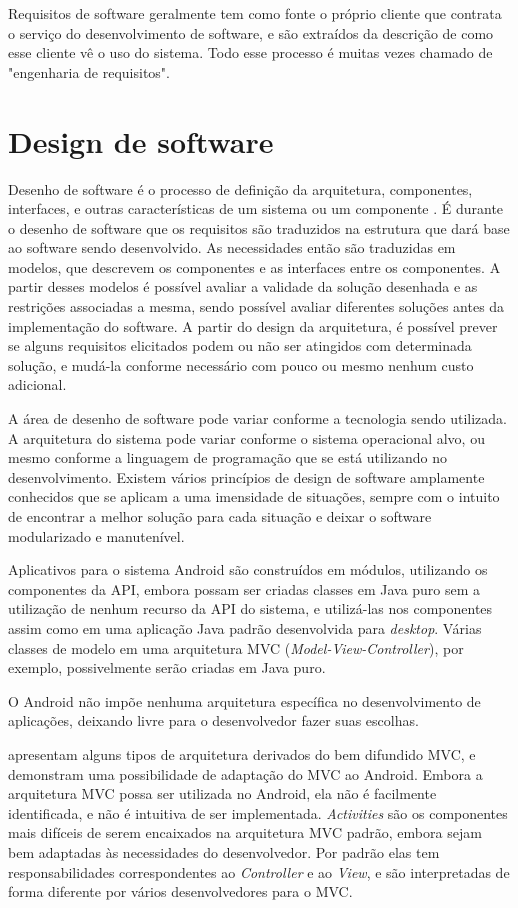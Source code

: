 Requisitos de software geralmente tem como fonte o próprio cliente que contrata o serviço do desenvolvimento de software, e são extraídos da descrição de como esse cliente vê o uso do sistema. Todo esse processo é muitas vezes chamado de "engenharia de requisitos".

\section{Design de software}

Desenho de software é o processo de definição da arquitetura, componentes, interfaces, e outras características de um sistema ou um componente \cite{swebok}. É durante o desenho de software que os requisitos são traduzidos na estrutura que dará base ao software sendo desenvolvido. As necessidades então são traduzidas em modelos, que descrevem os componentes e as interfaces entre os componentes. A partir desses modelos é possível avaliar a validade da solução desenhada e as restrições associadas a mesma, sendo possível avaliar diferentes soluções antes da implementação do software. A partir do design da arquitetura, é possível prever se alguns requisitos elicitados podem ou não ser atingidos com determinada solução, e mudá-la conforme necessário com pouco ou mesmo nenhum custo adicional.

A área de desenho de software pode variar conforme a tecnologia sendo utilizada. A arquitetura do sistema pode variar conforme o sistema operacional alvo, ou mesmo conforme a linguagem de programação que se está utilizando no desenvolvimento. Existem vários princípios de design de software amplamente conhecidos que se aplicam a uma imensidade de situações, sempre com o intuito de encontrar a melhor solução para cada situação e deixar o software modularizado e manutenível.

Aplicativos para o sistema Android são construídos em módulos, utilizando os componentes da API, embora possam ser criadas classes em Java puro sem a utilização de nenhum recurso da API do sistema, e utilizá-las nos componentes assim como em uma aplicação Java padrão desenvolvida para \textit{desktop}. Várias classes de modelo em uma arquitetura MVC (\textit{Model-View-Controller}), por exemplo, possivelmente serão criadas em Java puro.

O Android não impõe nenhuma arquitetura específica no desenvolvimento de aplicações, deixando livre para o desenvolvedor fazer suas escolhas.

 apresentam alguns tipos de arquitetura derivados do bem difundido MVC, e demonstram uma possibilidade de adaptação do MVC ao Android. Embora a arquitetura MVC possa ser utilizada no Android, ela não é facilmente identificada, e não é intuitiva de ser implementada. \textit{Activities} são os componentes mais difíceis de serem encaixados na arquitetura MVC padrão, embora sejam bem adaptadas às necessidades do desenvolvedor. Por padrão elas tem responsabilidades correspondentes ao \textit{Controller} e ao \textit{View}, e são interpretadas de forma diferente por vários desenvolvedores para o MVC.

